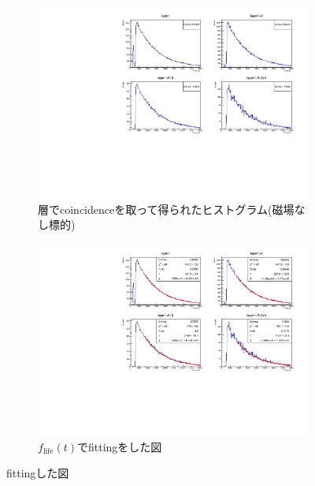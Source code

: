 \begin{figure}[H]
\centering
\begin{subfigure}{\columnwidth}
\centering
\includegraphics[height = 0.9\columnwidth , angle = -90]{figure/ikemitsu/lt_layercoin.pdf}
\caption{層でcoincidenceを取って得られたヒストグラム(磁場なし標的)}
\label{lt_layercoin}
\end{subfigure}
\begin{subfigure}{\columnwidth}
\centering
\includegraphics[height = 0.9\columnwidth , angle = -90]{figure/ikemitsu/lt_layercoin_fit.pdf}
\caption{$f_{\mathrm{life}}(t)$でfittingをした図}
\label{lt_layercoin_fit}
\end{subfigure}
\caption{fittingした図}
\label{lt_layercoin_all}
\end{figure}

